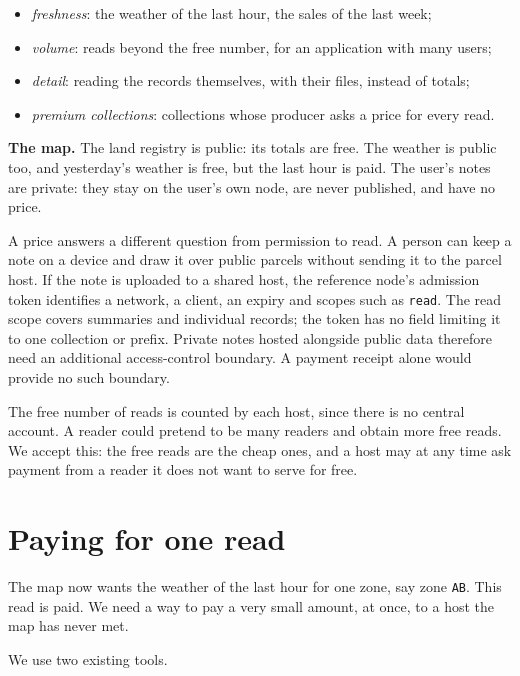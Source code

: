\documentclass[11pt]{article}
\begin{document}
\begin{itemize}[leftmargin=1.5em,itemsep=0pt,topsep=0pt]
\item \emph{freshness}: the weather of the last hour, the sales of the last week;
\item \emph{volume}: reads beyond the free number, for an application with many users;
\item \emph{detail}: reading the records themselves, with their files, instead of totals;
\item \emph{premium collections}: collections whose producer asks a price for every read.
\end{itemize}

\begin{example}
\textbf{The map.} The land registry is public: its totals are free. The weather is public too, and yesterday's weather is free, but the last hour is paid. The user's notes are private: they stay on the user's own node, are never published, and have no price.
\end{example}

A price answers a different question from permission to read. A person can keep a note on a device and draw it over public parcels without sending it to the parcel host. If the note is uploaded to a shared host, the reference node's admission token identifies a network, a client, an expiry and scopes such as \texttt{read}. The read scope covers summaries and individual records; the token has no field limiting it to one collection or prefix. Private notes hosted alongside public data therefore need an additional access-control boundary. A payment receipt alone would provide no such boundary.

The free number of reads is counted by each host, since there is no central account. A reader could pretend to be many readers and obtain more free reads. We accept this: the free reads are the cheap ones, and a host may at any time ask payment from a reader it does not want to serve for free.

\section{Paying for one read}\hypertarget{ix:payment}{}

The map now wants the weather of the last hour for one zone, say zone \texttt{AB}. This read is paid. We need a way to pay a very small amount, at once, to a host the map has never met.

We use two existing tools.
\end{document}

